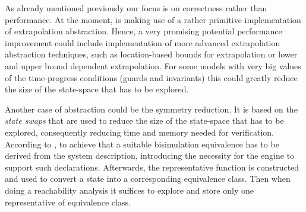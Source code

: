 As already mentioned previously our focus is on correctness rather than performance. At the moment, \jecdar is making use of a rather primitive implementation of extrapolation abstraction. Hence, a very promising potential performance improvement could include implementation of more advanced extrapolation abstraction techniques, such as location-based bounds for extrapolation or lower and upper bound dependent extrapolation. For some models with very big values of the time-progress conditions (guards and invariants) this could greatly reduce the size of the state-space that has to be explored.

Another case of abstraction could be the symmetry reduction. It is based on the \textit{state swaps} that are used to reduce the size of the state-space that has to be explored, consequently reducing time and memory needed for verification. According to \textcite{SymmetryReduction}, to achieve that a suitable bisimulation equivalence has to be derived from the system description, introducing the necessity for the engine to support such declarations. Afterwards, the representative function is constructed and used to convert a state into a corresponding equivalence class. Then when doing a reachability analysis it suffices to explore and store only one representative of equivalence class.
